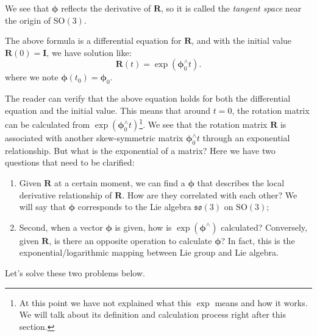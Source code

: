 We see that $\boldsymbol{\phi}$ reflects the derivative of $\mathbf{R}$, so it is called the \textit{tangent space} near the origin of $\mathrm{SO}(3)$. 


The above formula is a differential equation for $\mathbf{R}$, and with the initial value $\mathbf{R}(0) = \mathbf{I}$, we have solution like:
\begin{equation}
\label{eq:so3ode}
\mathbf{R}(t) = \exp \left( \boldsymbol{\phi}_0^\wedge t \right).
\end{equation}
where we note $\boldsymbol{\phi}(t_0) = \boldsymbol{\phi}_0$.

The reader can verify that the above equation holds for both the differential equation and the initial value. This means that around $t = 0$, the rotation matrix can be calculated from $\exp \left( \boldsymbol{\phi}_0^\wedge t \right)$\footnote{At this point we have not explained what this $\exp$ means and how it works. We will talk about its definition and calculation process right after this section. }. We see that the rotation matrix $\mathbf{R}$ is associated with another skew-symmetric matrix $\boldsymbol{\phi}_0^\wedge t$ through an exponential relationship. But what is the exponential of a matrix? Here we have two questions that need to be clarified:

\begin{enumerate}
    \item Given $\mathbf{R}$ at a certain moment, we can find a $\boldsymbol{\phi}$ that describes the local derivative relationship of $\mathbf{R}$. How are they correlated with each other? We will say that $\boldsymbol{\phi}$ corresponds to the Lie algebra $\mathfrak{so}(3)$ on $\mathrm{SO}(3)$;
    \item Second, when a vector $\boldsymbol{\phi}$ is given, how is $\exp (\boldsymbol{\phi} ^\wedge )$ calculated? Conversely, given $\mathbf{R}$, is there an opposite operation to calculate $\boldsymbol{\phi}$? In fact, this is the exponential/logarithmic mapping between Lie group and Lie algebra.
\end{enumerate}

Let's solve these two problems below.

